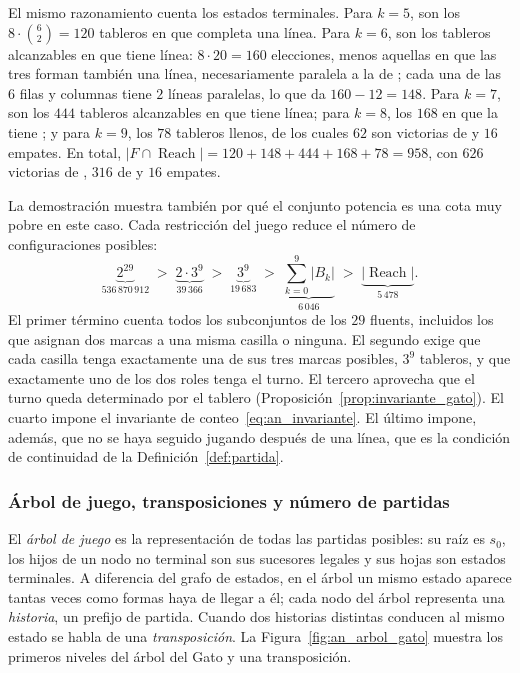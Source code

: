 El mismo razonamiento cuenta los estados terminales. Para $k = 5$, son los $8 \cdot \binom{6}{2} = 120$ tableros en que  completa una línea. Para $k = 6$, son los tableros alcanzables en que  tiene línea: $8 \cdot 20 = 160$ elecciones, menos aquellas en que las tres  forman también una línea, necesariamente paralela a la de ; cada una de las $6$ filas y columnas tiene $2$ líneas paralelas, lo que da $160 - 12 = 148$. Para $k = 7$, son los $444$ tableros alcanzables en que  tiene línea; para $k = 8$, los $168$ en que la tiene ; y para $k = 9$, los $78$ tableros llenos, de los cuales $62$ son victorias de  y $16$ empates. En total, $|F \cap \operatorname{Reach}| = 120 + 148 + 444 + 168 + 78 = 958$, con $626$ victorias de , $316$ de  y $16$ empates.

La demostración muestra también por qué el conjunto potencia es una cota muy pobre en este caso. Cada restricción del juego reduce el número de configuraciones posibles:
\begin{equation}
    \underbrace{2^{29}}_{536\,870\,912}
    \;>\; \underbrace{2 \cdot 3^9}_{39\,366}
    \;>\; \underbrace{3^9}_{19\,683}
    \;>\; \underbrace{\textstyle\sum_{k=0}^{9} |B_k|}_{6\,046}
    \;>\; \underbrace{|\operatorname{Reach}|}_{5\,478}.
    \label{eq:an_cadena_cotas}
\end{equation}
El primer término cuenta todos los subconjuntos de los $29$ fluents, incluidos los que asignan dos marcas a una misma casilla o ninguna. El segundo exige que cada casilla tenga exactamente una de sus tres marcas posibles, $3^9$ tableros, y que exactamente uno de los dos roles tenga el turno. El tercero aprovecha que el turno queda determinado por el tablero (Proposición~\ref{prop:invariante_gato}). El cuarto impone el invariante de conteo~\eqref{eq:an_invariante}. El último impone, además, que no se haya seguido jugando después de una línea, que es la condición de continuidad de la Definición~\ref{def:partida}.

\subsubsection{Árbol de juego, transposiciones y número de partidas}

El \emph{árbol de juego} es la representación de todas las partidas posibles: su raíz es $s_0$, los hijos de un nodo no terminal son sus sucesores legales y sus hojas son estados terminales. A diferencia del grafo de estados, en el árbol un mismo estado aparece tantas veces como formas haya de llegar a él; cada nodo del árbol representa una \emph{historia}, un prefijo de partida. Cuando dos historias distintas conducen al mismo estado se habla de una \emph{transposición}. La Figura~\ref{fig:an_arbol_gato} muestra los primeros niveles del árbol del Gato y una transposición.

